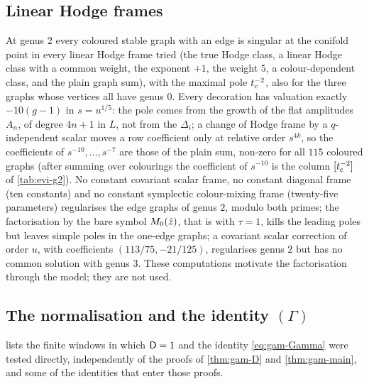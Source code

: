
\subsection{Linear Hodge frames}
\label{sec:evi-hodge}

At genus $2$ every coloured stable graph with an edge is singular at the conifold point in every linear Hodge frame tried (the true Hodge class, a linear Hodge class with a common weight, the exponent $+1$, the weight $5$, a colour-dependent class, and the plain graph sum), with the maximal pole $t_{\mathrm{c}}^{-2}$, also for the three graphs whose vertices all have genus $0$. Every decoration has valuation exactly $-10(g-1)$ in $s=u^{1/5}$: the pole comes from the growth of the flat amplitudes $A_n$, of degree $4n+1$ in $L$, not from the $\Delta_i$; a change of Hodge frame by a $q$-independent scalar moves a row coefficient only at relative order $s^{4k}$, so the coefficients of $s^{-10},\dots,s^{-7}$ are those of the plain sum, non-zero for all $115$ coloured graphs (after summing over colourings the coefficient of $s^{-10}$ is the column $[t_{\mathrm{c}}^{-2}]$ of \cref{tab:evi-g2}). No constant covariant scalar frame, no constant diagonal frame (ten constants) and no constant symplectic colour-mixing frame (twenty-five parameters) regularises the edge graphs of genus $2$, modulo both primes; the factorisation by the bare symbol $M_{0}(\hat{z})$, that is with $\tau=1$, kills the leading poles but leaves simple poles in the one-edge graphs; a covariant scalar correction of order $u$, with coefficients $(113/75,-21/125)$, regularises genus $2$ but has no common solution with genus $3$. These computations motivate the factorisation through the model; they are not used.

\subsection{The normalisation and the identity \texorpdfstring{$(\Gamma)$}{(Gamma)}}
\label{sec:evi-normal}

 lists the finite windows in which $\mathsf{D}=1$ and the identity \eqref{eq:gam-Gamma} were tested directly, independently of the proofs of \cref{thm:gam-D} and \cref{thm:gam-main}, and some of the identities that enter those proofs.

